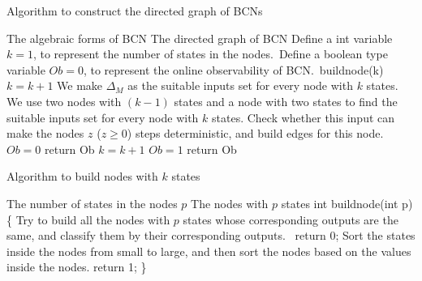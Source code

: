 \begin{algorithm}[h]
\caption{Algorithm to construct the directed graph of BCNs}
\begin{algorithmic}[1]
\REQUIRE 
The algebraic forms of BCN
\ENSURE  
The directed graph of BCN
\STATE Define a int variable $k=1$, to represent the number of states in the nodes.\
\STATE Define a boolean type variable $Ob=0$, to represent the online observability of BCN.\
\STATE buildnode(k)
\STATE $k= k+1$
\STATE We make $\Delta_M$ as the suitable inputs set for every node with $k$ states.
\ELSE
\IF{$k>2$}
\STATE We use two nodes with $(k-1)$ states and a node with two states to find the suitable inputs set for every node with $k$ states. 
\ENDIF
\ENDIF
{}
\STATE Check whether this input can make the nodes $z$ ($z\ge0$) steps deterministic, and build edges for this node.
\ENDFOR
\ENDFOR
{}
\STATE $Ob=0$ return Ob
\ENDIF
\STATE $k= k+1$
\ENDWHILE
\STATE $Ob=1$ return Ob
\end{algorithmic}
 \label{alg:1}
\end{algorithm}

\begin{algorithm}[h]
\caption{Algorithm to build nodes with $k$ states}
\begin{algorithmic}[1]
\REQUIRE 
The number of states in the nodes $p$
\ENSURE  
The nodes with $p$ states
\STATE int buildnode(int p)
\STATE  \{ 
\STATE  Try to build all the nodes with $p$ states whose corresponding outputs are the same, and classify them by their corresponding outputs.\
\STATE  return 0;
\ELSE 
\STATE Sort the states inside the nodes from small to large, and then sort the nodes based on the values inside the nodes. %
\STATE return 1;
\ENDIF 
\STATE \}
\end{algorithmic}
 \label{alg:2}
\end{algorithm}

